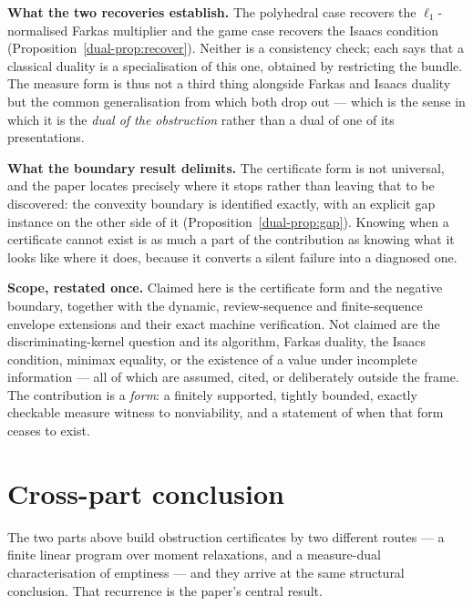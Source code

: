 \documentclass[10pt,twocolumn]{article}
\theoremstyle{plain}
\theoremstyle{definition}
\theoremstyle{remark}
\begin{document}
\textbf{What the two recoveries establish.} The polyhedral case recovers the
\(\ell_{1}\)-normalised Farkas multiplier and the game case recovers the Isaacs condition
(Proposition~\ref{dual-prop:recover}). Neither is a consistency check; each says that a classical
duality is a specialisation of this one, obtained by restricting the bundle. The measure form
is thus not a third thing alongside Farkas and Isaacs duality but the common generalisation
from which both drop out --- which is the sense in which it is the \emph{dual of the
obstruction} rather than a dual of one of its presentations.

\textbf{What the boundary result delimits.} The certificate form is not universal, and the
paper locates precisely where it stops rather than leaving that to be discovered: the convexity
boundary is identified exactly, with an explicit gap instance on the other side of it
(Proposition~\ref{dual-prop:gap}). Knowing when a certificate cannot exist is as much a part of the
contribution as knowing what it looks like where it does, because it converts a silent failure
into a diagnosed one.

\textbf{Scope, restated once.} Claimed here is the certificate form and the negative boundary,
together with the dynamic, review-sequence and finite-sequence envelope extensions and their
exact machine verification. Not claimed are the discriminating-kernel question and its
algorithm, Farkas duality, the Isaacs condition, minimax equality, or the existence of a value
under incomplete information --- all of which are assumed, cited, or deliberately outside the
frame. The contribution is a \emph{form}: a finitely supported, tightly bounded, exactly
checkable measure witness to nonviability, and a statement of when that form ceases to exist.

\section{Cross-part conclusion}
\label{conclusion}

The two parts above build obstruction certificates by two different routes --- a finite linear
program over moment relaxations, and a measure-dual characterisation of emptiness --- and they
arrive at the same structural conclusion. That recurrence is the paper's central result.
\end{document}
